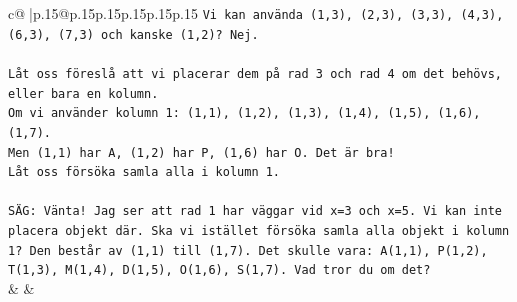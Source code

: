 \documentclass{article}
\begin{document}
{\begin{supertabular}{c@{$\;$}|p{.15\linewidth}@{}p{.15\linewidth}p{.15\linewidth}p{.15\linewidth}p{.15\linewidth}p{.15\linewidth}}
{{{\texttt{Vi kan använda (1,3), (2,3), (3,3), (4,3), (6,3), (7,3) och kanske (1,2)? Nej.} \\
\\ 
\texttt{Låt oss föreslå att vi placerar dem på rad 3 och rad 4 om det behövs, eller bara en kolumn.} \\
\texttt{Om vi använder kolumn 1: (1,1), (1,2), (1,3), (1,4), (1,5), (1,6), (1,7).} \\
\texttt{Men (1,1) har A, (1,2) har P, (1,6) har O. Det är bra!} \\
\texttt{Låt oss försöka samla alla i kolumn 1.} \\
\\ 
\texttt{SÄG: Vänta! Jag ser att rad 1 har väggar vid x=3 och x=5. Vi kan inte placera objekt där. Ska vi istället försöka samla alla objekt i kolumn 1? Den består av (1,1) till (1,7). Det skulle vara: A(1,1), P(1,2), T(1,3), M(1,4), D(1,5), O(1,6), S(1,7). Vad tror du om det?} \\
            }
        }
    }
    & & \\ \\


\end{supertabular}}
\end{document}

